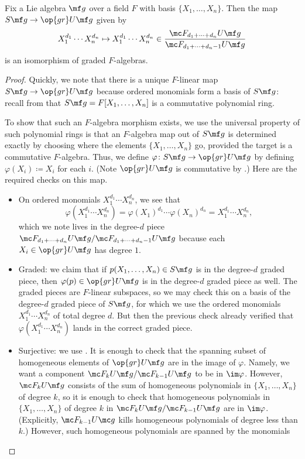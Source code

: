 \documentclass[../notes.tex]{subfiles}
\begin{document}
\begin{proposition} \label{prop:gr-ug-is-sg}
	Fix a Lie algebra $\mf g$ over a field $F$ with basis $\{X_1,\ldots,X_n\}$. Then the map $S\mf g\to\op{gr}U\mf g$ given by
	\[X_1^{d_1}\cdots X_n^{d_n}\mapsto X_1^{d_1}\cdots X_n^{d_n}\in\frac{\mc F_{d_1+\cdots+d_n}U\mf g}{\mc F_{d_1+\cdots+d_n-1}U\mf g}\]
	is an isomorphism of graded $F$-algebras.
\end{proposition}
\begin{proof}
	Quickly, we note that there is a unique $F$-linear map $S\mf g\to\op{gr}U\mf g$ because ordered monomials form a basis of $S\mf g$: recall from  that $S\mf g=F[X_1,\ldots,X_n]$ is a commutative polynomial ring.
	
	To show that such an $F$-algebra morphism exists, we use the universal property of such polynomial rings is that an $F$-algebra map out of $S\mf g$ is determined exactly by choosing where the elements $\{X_1,\ldots,X_n\}$ go, provided the target is a commutative $F$-algebra. Thus, we define $\varphi\colon S\mf g\to\op{gr}U\mf g$ by defining $\varphi(X_i)\coloneqq X_i$ for each $i$. (Note $\op{gr}U\mf g$ is commutative by .) Here are the required checks on this map.
	\begin{itemize}
		\item On ordered monomials $X_1^{d_1}\cdots X_n^{d_n}$, we see that
		\[\varphi\left(X_1^{d_1}\cdots X_n^{d_n}\right)=\varphi(X_1)^{d_1}\cdots\varphi(X_n)^{d_n}=X_1^{d_1}\cdots X_n^{d_n},\]
		which we note lives in the degree-$d$ piece $\mc F_{d_1+\cdots+d_n}U\mf g/\mc F_{d_1+\cdots+d_n-1}U\mf g$ because each $X_i\in\op{gr}U\mf g$ has degree $1$.
		\item Graded: we claim that if $p(X_1,\ldots,X_n)\in S\mf g$ is in the degree-$d$ graded piece, then $\varphi(p)\in\op{gr}U\mf g$ is in the degree-$d$ graded piece as well. The graded pieces are $F$-linear subspaces, so we may check this on a basis of the degree-$d$ graded piece of $S\mf g$, for which we use the ordered monomials $X_1^{d_1}\cdots X_n^{d_n}$ of total degree $d$. But then the previous check already verified that $\varphi\left(X_1^{d_1}\cdots X_n^{d_n}\right)$ lands in the correct graded piece.
		\item Surjective: we use . It is enough to check that the spanning subset of homogeneous elements of $\op{gr}U\mf g$ are in the image of $\varphi$. Namely, we want a component $\mc F_kU\mf g/\mc F_{k-1}U\mf g$ to be in $\im\varphi$. However, $\mc F_kU\mf g$ consists of the sum of homogeneous polynomials in $\{X_1,\ldots,X_n\}$ of degree $k$, so it is enough to check that homogeneous polynomials in $\{X_1,\ldots,X_n\}$ of degree $k$ in $\mc F_kU\mf g/\mc F_{k-1}U\mf g$ are in $\im\varphi$. (Explicitly, $\mc F_{k-1}U\mc g$ kills homogeneous polynomials of degree less than $k$.) However, such homogeneous polynomials are spanned by the monomials

\end{itemize}
\end{proof}
\end{document}

